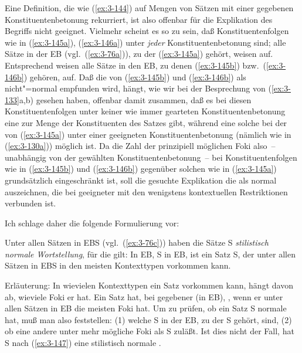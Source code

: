 \documentclass[output=paper]{langsci/langscibook}
\begin{document}
Eine Definition, die wie (\ref{ex:3-144}) auf Mengen von Sätzen mit einer
gegebenen Konstituentenbetonung rekurriert, ist also offenbar für die Explikation des Begriffs  nicht geeignet. Vielmehr scheint es so zu sein, daß Konstituentenfolgen wie in (\ref{ex:3-145a}), (\ref{ex:3-146a}) unter \textit{jeder} Konstituentenbetonung  sind; \dash alle Sätze in der EB (vgl.\ (\ref{ex:3-76a})), zu der (\ref{ex:3-145a}) gehört, weisen   auf. Entsprechend weisen alle Sätze in den EB, zu denen (\ref{ex:3-145b}) bzw.\ (\ref{ex:3-146b}) gehören,   auf. Daß die  von (\ref{ex:3-145b}) und (\ref{ex:3-146b}) als nicht"=normal empfunden wird, hängt, wie wir bei der Besprechung von (\ref{ex:3-133}a,b) gesehen haben, offenbar damit zusammen, daß es bei diesen Konstituentenfolgen unter keiner wie immer gearteten Konstituentenbetonung eine  zur Menge der Konstituenten des Satzes gibt, während eine solche  bei der  von (\ref{ex:3-145a}) unter einer geeigneten Konstituentenbetonung (nämlich wie in (\ref{ex:3-130a})) möglich ist. Da die Zahl der prinzipiell möglichen Foki also~-- unabhängig von der gewählten Konstituentenbetonung~-- bei Konstituentenfolgen wie in (\ref{ex:3-145b}) und (\ref{ex:3-146b}) gegenüber solchen wie in (\ref{ex:3-145a}) grundsätzlich
eingeschränkt ist, soll die gesuchte Explikation die  als
normal auszeichnen, die bei geeigneter  mit den wenigstens
kontextuellen Restriktionen verbunden ist.

Ich schlage daher die folgende Formulierung vor:
\begin{exe}
\ex\label{ex:3-147}
Unter allen Sätzen in EBS (vgl.\ (\ref{ex:3-76c})) haben die Sätze S\textit{}
\textit{stilistisch normale Wortstellung}, für die gilt: In EB, S\textit{} in EB,
ist ein Satz S\textit{}, der unter allen Sätzen in EBS in den meisten
Kontexttypen vorkommen kann.
\end{exe}
Erläuterung: In wievielen Kontexttypen ein Satz vorkommen kann, hängt davon ab, wieviele Foki er hat. Ein Satz hat, bei gegebener  (\dash in EB), , wenn er unter allen Sätzen in EB die meisten Foki hat. Um zu prüfen, ob ein Satz S normale  hat, muß man also feststellen: (1) welche S in der EB, zu der S gehört,  sind, (2) ob eine andere  unter  mehr mögliche Foki als S zuläßt. Ist dies nicht der Fall, hat S nach (\ref{ex:3-147}) eine stilistisch normale .
\end{document}
